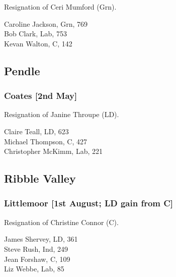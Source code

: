 \documentclass[a4paper,openany,10pt]{book}
\begin{document}

Resignation of Ceri Mumford (Grn).



Caroline Jackson, Grn, 769\\
Bob Clark, Lab, 753\\
Kevan Walton, C, 142\\


\subsection*{Pendle}

\subsubsection*{Coates \hspace*{\fill}\nolinebreak[1]%
\enspace\hspace*{\fill}
[2nd May]}


Resignation of Janine Throupe (LD).



Claire Teall, LD, 623\\
Michael Thompson, C, 427\\
Christopher McKimm, Lab, 221\\


\subsection*{Ribble Valley}

\subsubsection*{Littlemoor \hspace*{\fill}\nolinebreak[1]%
\enspace\hspace*{\fill}
[1st August; LD gain from C]}


Resignation of Christine Connor (C).



James Shervey, LD, 361\\
Steve Rush, Ind, 249\\
Jean Forshaw, C, 109\\
Liz Webbe, Lab, 85\\
\end{document}

